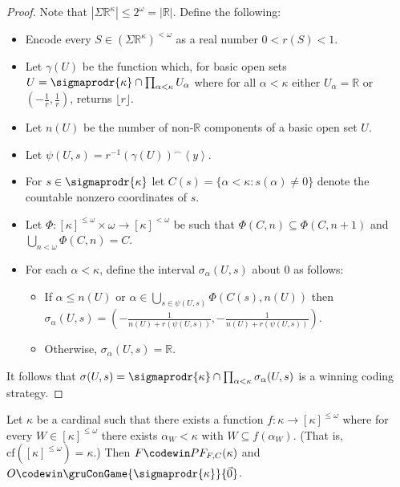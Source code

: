 \begin{proof}
Note that $|\Sigma\mathbb{R}^\kappa| \leq 2^\omega = |\mathbb{R}|$. Define the following:

    \begin{itemize}
    \item Encode every $S \in (\Sigma\mathbb{R}^{\kappa})^{<\omega}$ as a real number $0<r(S)<1$.
    \item Let $\gamma(U)$ be the function which, for basic open sets $U=\sigmaprodr{\kappa}\cap\prod_{\alpha<\kappa}U_\alpha$ where for all $\alpha<\kappa$ either $U_\alpha=\mathbb{R}$ or $(-\frac{1}{r},\frac{1}{r})$, returns $\lfloor r \rfloor$.
    \item Let $n(U)$ be the number of non-$\mathbb{R}$ components of a basic open set $U$.
    \item Let $\psi(U,s)=r^{-1}(\gamma(U))^\frown\left<y\right>$.
    \item For $s\in\sigmaprodr{\kappa}$ let $C(s)=\{\alpha<\kappa:s(\alpha)\not=0\}$ denote the countable nonzero coordinates of $s$.
    \item Let $\Phi:[\kappa]^{\leq\omega}\times\omega\to[\kappa]^{<\omega}$ be such that $\Phi(C,n)\subseteq\Phi(C,n+1)$ and $\bigcup_{n<\omega}\Phi(C,n)=C$.
    \item For each $\alpha<\kappa$, define the interval $\sigma_\alpha(U,s)$ about $0$ as follows:
        \begin{itemize}
        \item If $\alpha\leq n(U)$ or $\alpha\in\bigcup_{s\in\psi(U,s)}\Phi(C(s),n(U))$ then $\sigma_\alpha(U,s)=(-\frac{1}{n(U)+r(\psi(U,s))},-\frac{1}{n(U)+r(\psi(U,s))})$.
        \item Otherwise, $\sigma_\alpha(U,s)=\mathbb{R}$.
        \end{itemize}
    \end{itemize}

It follows that $\sigma(U,s)=\sigmaprodr{\kappa}\cap\prod_{\alpha<\kappa} \sigma_\alpha(U,s)$ is a winning coding strategy.
\end{proof}

\begin{thm}
Let $\kappa$ be a cardinal such that there exists a function $f:\kappa\to[\kappa]^{\leq \omega}$ where for every $W\in[\kappa]^{\leq\omega}$ there exists $\alpha_W<\kappa$ with $W\subseteq f(\alpha_W)$. (That is, $\textrm{cf}([\kappa]^{\leq\omega})=\kappa$.) Then $F \codewin PF_{F,C}(\kappa)$ and $O \codewin \gruConGame{\sigmaprodr{\kappa}}{\vec{0}}$.
\end{thm}

